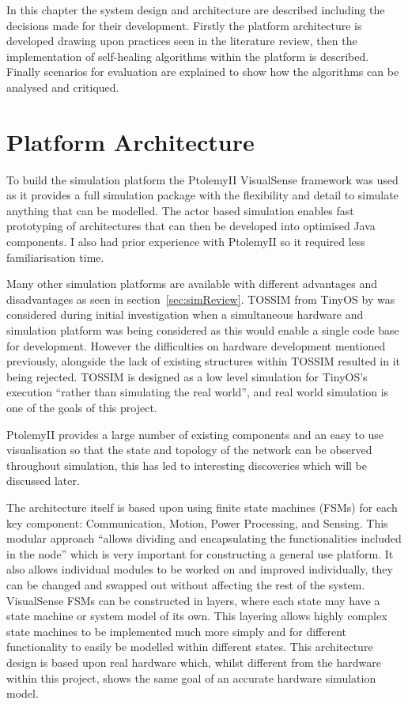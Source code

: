 \documentclass[authoryearcitations]{UoYCSproject}
\begin{document}
In this chapter the system design and architecture are described including the decisions made for their development. Firstly the platform architecture is developed drawing upon practices seen in the literature review, then the implementation of self-healing algorithms within the platform is described. Finally scenarios for evaluation are explained to show how the algorithms can be analysed and critiqued.

\section{Platform Architecture}

To build the simulation platform the PtolemyII VisualSense framework \citep{Baldwin2005} was used as it provides a full simulation package with the flexibility and detail to simulate anything that can be modelled. The actor based simulation enables fast prototyping of architectures that can then be developed into optimised Java components. I also had prior experience with PtolemyII so it required less familiarisation time.

Many other simulation platforms are available with different advantages and disadvantages as seen in section~\ref{sec:simReview}. TOSSIM \citep{Levis2003} from TinyOS by \citet{Levis2005} was considered during initial investigation when a simultaneous hardware and simulation platform was being considered as this would enable a single code base for development. However the difficulties on hardware development mentioned previously, alongside the lack of existing structures within TOSSIM resulted in it being rejected. TOSSIM is designed as a low level simulation for TinyOS's execution ``rather than simulating the real world'', and real world simulation is one of the goals of this project.

PtolemyII provides a large number of existing components and an easy to use visualisation so that the state and topology of the network can be observed throughout simulation, this has led to interesting discoveries which will be discussed later.

The architecture itself is based upon \citet{Rosello2009} using finite state machines (FSMs) for each key component: Communication, Motion, Power Processing, and Sensing. This modular approach ``allows dividing and encapsulating the functionalities included in the node'' which is very important for constructing a general use platform. It also allows individual modules to be worked on and improved individually, they can be changed and swapped out without affecting the rest of the system. VisualSense FSMs can be constructed in layers, where each state may have a state machine or system model of its own. This layering allows highly complex state machines to be implemented much more simply and for different functionality to easily be modelled within different states. This architecture design is based upon real hardware which, whilst different from the hardware within this project, shows the same goal of an accurate hardware simulation model.
\end{document}

